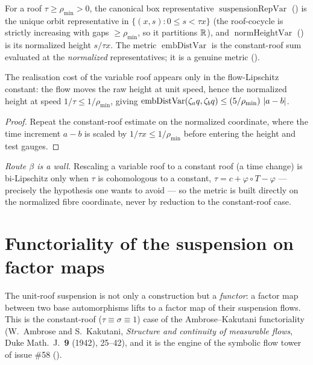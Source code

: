 \begin{definition}\label{embDistVar}
  \leanok
  For a roof $\tau\ge\rho_{\min} > 0$, the canonical box representative
  $\operatorname{suspensionRepVar}$ () is the unique orbit
  representative in $\{(x,s) : 0\le s < \tau x\}$ (the roof-cocycle is strictly increasing with gaps
  $\ge\rho_{\min}$, so it partitions $\mathbb{R}$), and $\operatorname{normHeightVar}$
  () is its normalized height $s/\tau x$. The metric
  $\operatorname{embDistVar}$ is the constant-roof sum evaluated at the \emph{normalized}
  representatives; it is a genuine metric ().
\end{definition}

\begin{theorem}\label{embDistVar_flow_le}
  \leanok
  The realisation cost of the variable roof appears only in the flow-Lipschitz constant: the flow
  moves the raw height at unit speed, hence the normalized height at speed $1/\tau\le 1/\rho_{\min}$,
  giving $\operatorname{embDistVar}(\zeta_a q, \zeta_b q)\le(5/\rho_{\min})\,\left\lvert a - b \right\rvert$.
\end{theorem}
\begin{proof}\leanok
  Repeat the constant-roof estimate  on the normalized coordinate, where the
  time increment $a - b$ is scaled by $1/\tau x\le 1/\rho_{\min}$ before entering the height and test
  gauges.
\end{proof}

\emph{Route $\beta$ is a wall.} Rescaling a variable roof to a constant roof (a time change) is
bi-Lipschitz only when $\tau$ is cohomologous to a constant, $\tau = c + \varphi\circ T - \varphi$ ---
precisely the hypothesis one wants to avoid --- so the metric is built directly on the normalized
fibre coordinate, never by reduction to the constant-roof case.

\section{Functoriality of the suspension on factor maps}\label{sec:susp-factor}

The unit-roof suspension is not only a construction but a \emph{functor}: a factor map between two
base automorphisms lifts to a factor map of their suspension flows. This is the constant-roof
(\(\tau\equiv\sigma\equiv 1\)) case of the Ambrose--Kakutani functoriality (W.~Ambrose and
S.~Kakutani, \emph{Structure and continuity of measurable flows}, Duke Math.\ J.\ \textbf{9} (1942),
25--42), and it is the engine of the symbolic flow tower of issue \#58 ().

